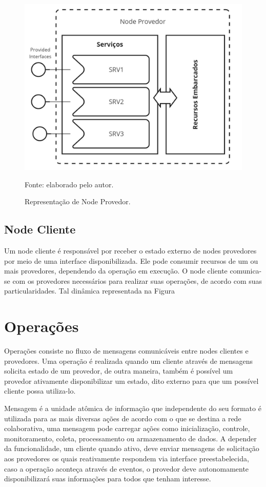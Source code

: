 \begin{figure}[H]
	\centering
	\caption{Representação de Node Provedor.}
	\label{fig:cap4nodeprovedor}
	\includegraphics[width=0.7\linewidth]{Imagens/cap4/cap4nodeprovedor}	
	
	Fonte: elaborado pelo autor.
\end{figure}

\subsection{Node Cliente}
Um node cliente é responsável por receber o estado externo de nodes provedores por meio de uma interface disponibilizada. Ele pode consumir recursos de um ou mais provedores, dependendo da operação em execução. O node cliente comunica-se com os provedores necessários para realizar suas operações, de acordo com suas particularidades. Tal dinâmica representada na Figura 

\section{Operações}
Operações consiste no fluxo de mensagens comunicáveis entre nodes clientes e provedores. Uma operação é realizada quando um cliente através de mensagens solicita estado de um provedor, de outra maneira, também é possível um provedor ativamente disponibilizar um estado, dito externo para que um possível cliente possa utiliza-lo. 

Mensagem é a unidade atômica de informação que independente do seu formato é utilizada para as mais diversas ações de acordo com o que se destina a rede colaborativa, uma mensagem pode carregar ações como  inicialização, controle, monitoramento, coleta, processamento ou armazenamento de dados. A depender da funcionalidade, um cliente quando ativo, deve enviar mensagens de solicitação aos provedores os quais reativamente respondem via interface preestabelecida, caso a operação aconteça através de eventos, o provedor deve autonomamente disponibilizará suas informações para todos que tenham interesse.

